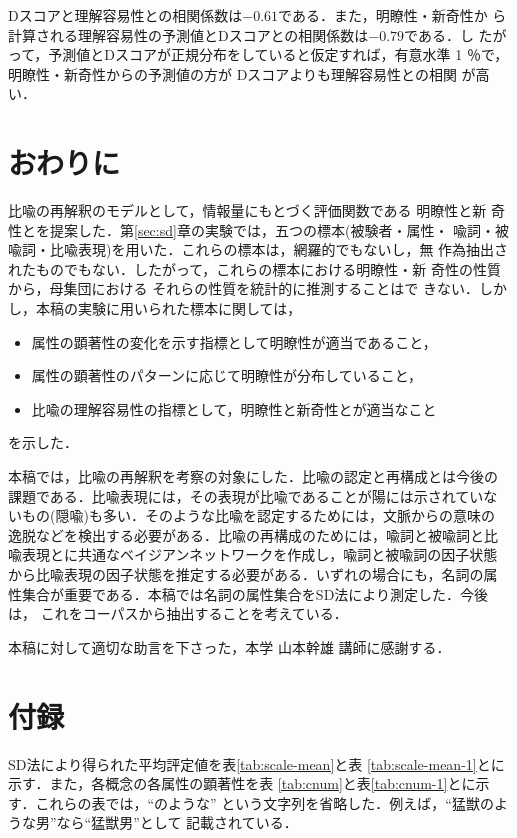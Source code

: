 Dスコアと理解容易性との相関係数は$-0.61$である．また，明瞭性・新奇性か
ら計算される理解容易性の予測値とDスコアとの相関係数は$-0.79$である．し
たがって，予測値とDスコアが正規分布をしていると仮定すれば，有意水準 1
％で，明瞭性・新奇性からの予測値の方が Dスコアよりも理解容易性との相関
が高い．

\section{おわりに}
\label{sec:summary}
比喩の再解釈のモデルとして，情報量にもとづく評価関数である 明瞭性と新
奇性とを提案した．第\ref{sec:sd}章の実験では，五つの標本(被験者・属性・
喩詞・被喩詞・比喩表現)を用いた．これらの標本は，網羅的でもないし，無
作為抽出されたものでもない．したがって，これらの標本における明瞭性・新
奇性の性質から，母集団における それらの性質を統計的に推測することはで
きない．しかし，本稿の実験に用いられた標本に関しては，
\begin{itemize}
\item 属性の顕著性の変化を示す指標として明瞭性が適当であること，
\item 属性の顕著性のパターンに応じて明瞭性が分布していること，
\item 比喩の理解容易性の指標として，明瞭性と新奇性とが適当なこと
\end{itemize}
を示した．

本稿では，比喩の再解釈を考察の対象にした．比喩の認定と再構成とは今後の
課題である．比喩表現には，その表現が比喩であることが陽には示されていな
いもの(隠喩)も多い．そのような比喩を認定するためには，文脈からの意味の
逸脱などを検出する必要がある．比喩の再構成のためには，喩詞と被喩詞と比
喩表現とに共通なベイジアンネットワークを作成し，喩詞と被喩詞の因子状態
から比喩表現の因子状態を推定する必要がある．いずれの場合にも，名詞の属
性集合が重要である．本稿では名詞の属性集合をSD法により測定した．今後は，
これをコーパスから抽出することを考えている．


\acknowledgment

本稿に対して適切な助言を下さった，本学 山本幹雄 講師に感謝する．

 




\section*{付録}
\label{sec:appendix}

SD法により得られた平均評定値を表\ref{tab:scale-mean}と表
\ref{tab:scale-mean-1}とに示す．また，各概念の各属性の顕著性を表
\ref{tab:cnum}と表\ref{tab:cnum-1}とに示す．これらの表では，``のような''
という文字列を省略した．例えば，``猛獣のような男''なら``猛獣男''として
記載されている．

